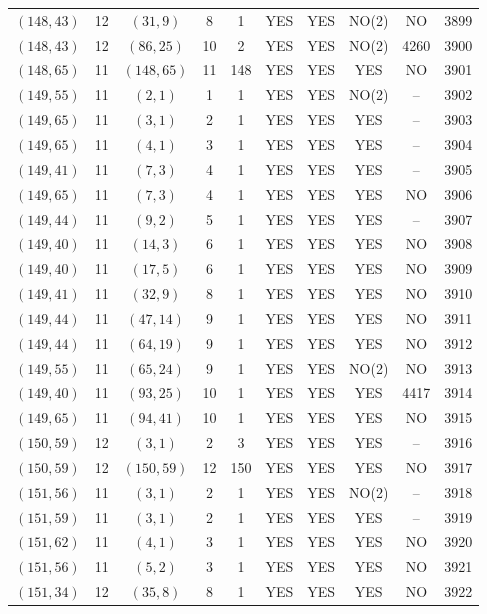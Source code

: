 \begin{longtable}{|c|c|c|c|c|c|c|c|c|c|}
$(148, 43)$ & 12 & $(31, 9)$ & 8 & 1 & YES & YES & NO(2) & NO & 3899\\
$(148, 43)$ & 12 & $(86, 25)$ & 10 & 2 & YES & YES & NO(2) & 4260 & 3900\\
$(148, 65)$ & 11 & $(148, 65)$ & 11 & 148 & YES & YES & YES & NO & 3901\\
$(149, 55)$ & 11 & $(2, 1)$ & 1 & 1 & YES & YES & NO(2) & -- & 3902\\
$(149, 65)$ & 11 & $(3, 1)$ & 2 & 1 & YES & YES & YES & -- & 3903\\
$(149, 65)$ & 11 & $(4, 1)$ & 3 & 1 & YES & YES & YES & -- & 3904\\
$(149, 41)$ & 11 & $(7, 3)$ & 4 & 1 & YES & YES & YES & -- & 3905\\
$(149, 65)$ & 11 & $(7, 3)$ & 4 & 1 & YES & YES & YES & NO & 3906\\
$(149, 44)$ & 11 & $(9, 2)$ & 5 & 1 & YES & YES & YES & -- & 3907\\
$(149, 40)$ & 11 & $(14, 3)$ & 6 & 1 & YES & YES & YES & NO & 3908\\
$(149, 40)$ & 11 & $(17, 5)$ & 6 & 1 & YES & YES & YES & NO & 3909\\
$(149, 41)$ & 11 & $(32, 9)$ & 8 & 1 & YES & YES & YES & NO & 3910\\
$(149, 44)$ & 11 & $(47, 14)$ & 9 & 1 & YES & YES & YES & NO & 3911\\
$(149, 44)$ & 11 & $(64, 19)$ & 9 & 1 & YES & YES & YES & NO & 3912\\
$(149, 55)$ & 11 & $(65, 24)$ & 9 & 1 & YES & YES & NO(2) & NO & 3913\\
$(149, 40)$ & 11 & $(93, 25)$ & 10 & 1 & YES & YES & YES & 4417 & 3914\\
$(149, 65)$ & 11 & $(94, 41)$ & 10 & 1 & YES & YES & YES & NO & 3915\\
$(150, 59)$ & 12 & $(3, 1)$ & 2 & 3 & YES & YES & YES & -- & 3916\\
$(150, 59)$ & 12 & $(150, 59)$ & 12 & 150 & YES & YES & YES & NO & 3917\\
$(151, 56)$ & 11 & $(3, 1)$ & 2 & 1 & YES & YES & NO(2) & -- & 3918\\
$(151, 59)$ & 11 & $(3, 1)$ & 2 & 1 & YES & YES & YES & -- & 3919\\
$(151, 62)$ & 11 & $(4, 1)$ & 3 & 1 & YES & YES & YES & NO & 3920\\
$(151, 56)$ & 11 & $(5, 2)$ & 3 & 1 & YES & YES & YES & NO & 3921\\
$(151, 34)$ & 12 & $(35, 8)$ & 8 & 1 & YES & YES & YES & NO & 3922\\

\end{longtable}
